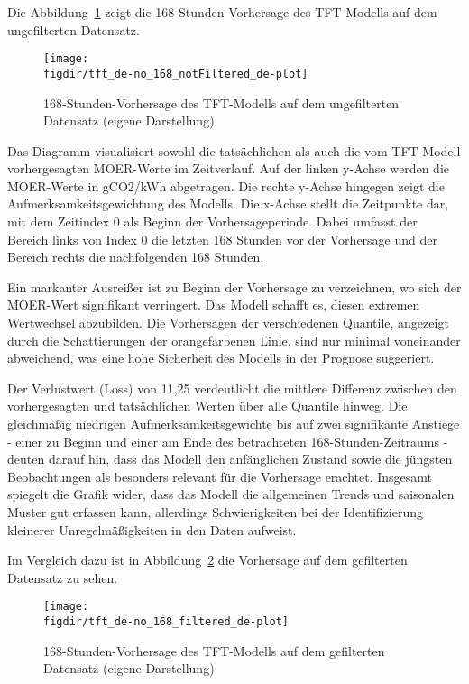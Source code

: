 Die Abbildung~\ref{FIG:tft-plot} zeigt die 168-Stunden-Vorhersage des \ac{TFT}-Modells auf dem ungefilterten Datensatz.
\begin{figure}
 \caption[TFT 168-Stunden-Vorhersage auf ungefiltertem Datensatz]{168-Stunden-Vorhersage des \ac{TFT}-Modells auf dem ungefilterten Datensatz (eigene Darstellung)}
 {\texttt{[image: \\figdir/tft\_de-no\_168\_notFiltered\_de-plot]}}
 \label{FIG:tft-plot}
\end{figure}
Das Diagramm visualisiert sowohl die tatsächlichen als auch die vom \ac{TFT}-Modell vorhergesagten \ac{MOER}-Werte im Zeitverlauf.
Auf der linken y-Achse werden die \ac{MOER}-Werte in g\ac{CO2}/kWh abgetragen.
Die rechte y-Achse hingegen zeigt die Aufmerksamkeitsgewichtung des Modells.
Die x-Achse stellt die Zeitpunkte dar, mit dem Zeitindex 0 als Beginn der Vorhersageperiode.
Dabei umfasst der Bereich links von Index 0 die letzten 168 Stunden vor der Vorhersage und der Bereich rechts die nachfolgenden 168 Stunden.

Ein markanter Ausreißer ist zu Beginn der Vorhersage zu verzeichnen, wo sich der \ac{MOER}-Wert signifikant verringert.
Das Modell schafft es, diesen extremen Wertwechsel abzubilden.
Die Vorhersagen der verschiedenen Quantile, angezeigt durch die Schattierungen der orangefarbenen Linie, sind nur minimal voneinander abweichend, was eine hohe Sicherheit des Modells in der Prognose suggeriert.

Der Verlustwert (Loss) von 11,25 verdeutlicht die mittlere Differenz zwischen den vorhergesagten und tatsächlichen Werten über alle Quantile hinweg.
Die gleichmäßig niedrigen Aufmerksamkeitsgewichte bis auf zwei signifikante Anstiege - einer zu Beginn und einer am Ende des betrachteten 168-Stunden-Zeitraums - deuten darauf hin, dass das Modell den anfänglichen Zustand sowie die jüngsten Beobachtungen als besonders relevant für die Vorhersage erachtet.
Insgesamt spiegelt die Grafik wider, dass das Modell die allgemeinen Trends und saisonalen Muster gut erfassen kann, allerdings Schwierigkeiten bei der Identifizierung kleinerer Unregelmäßigkeiten in den Daten aufweist.

Im Vergleich dazu ist in Abbildung~\ref{FIG:tft-plot-2} die Vorhersage auf dem gefilterten Datensatz zu sehen.
\begin{figure}
 \caption[TFT 168-Stunden-Vorhersage auf gefiltertem Datensatz]{168-Stunden-Vorhersage des \ac{TFT}-Modells auf dem gefilterten Datensatz (eigene Darstellung)}
 {\texttt{[image: \\figdir/tft\_de-no\_168\_filtered\_de-plot]}}
 \label{FIG:tft-plot-2}
\end{figure}

